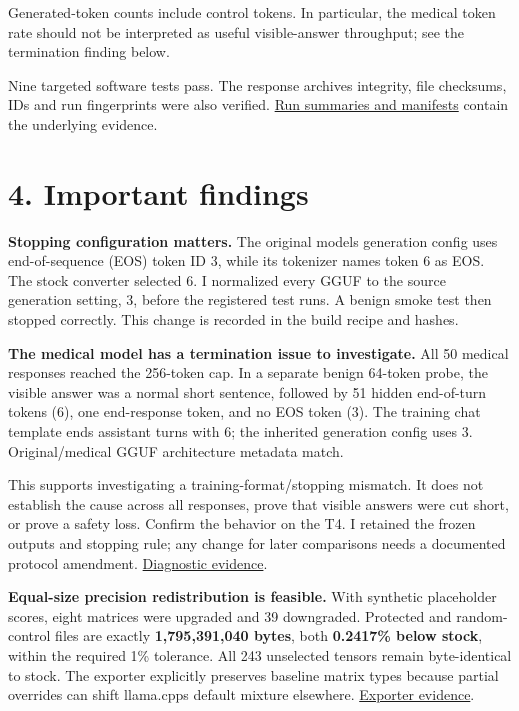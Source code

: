 \documentclass[11pt,a4paper]{article}
\begin{document}
Generated-token counts include control tokens. In particular, the
medical token rate should not be interpreted as useful visible-answer
throughput; see the termination finding below.

Nine targeted software tests pass. The response
archive\textquotesingle s integrity, file checksums, IDs and run
fingerprints were also verified.
\href{https://github.com/SushovitNanda/Lexsi_Hackathon/tree/manishshaw/results/mac/}{Run
summaries and manifests} contain the underlying evidence.

\section{4. Important findings}\label{important-findings}

\textbf{Stopping configuration matters.} The original
model\textquotesingle s generation config uses end-of-sequence (EOS)
token ID 3, while its tokenizer names token 6 as EOS. The stock
converter selected 6. I normalized every GGUF to the source generation
setting, 3, before the registered test runs. A benign smoke test then
stopped correctly. This change is recorded in the build recipe and
hashes.

\textbf{The medical model has a termination issue to investigate.} All
50 medical responses reached the 256-token cap. In a separate benign
64-token probe, the visible answer was a normal short sentence, followed
by 51 hidden end-of-turn tokens (6), one end-response token, and no EOS
token (3). The training chat template ends assistant turns with 6; the
inherited generation config uses 3. Original/medical GGUF architecture
metadata match.

This supports investigating a training-format/stopping mismatch. It does
not establish the cause across all responses, prove that visible answers
were cut short, or prove a safety loss. Confirm the behavior on the T4.
I retained the frozen outputs and stopping rule; any change for later
comparisons needs a documented protocol amendment.
\href{https://github.com/SushovitNanda/Lexsi_Hackathon/blob/manishshaw/results/mac/medical_termination_diagnostic.json}{Diagnostic
evidence}.

\textbf{Equal-size precision redistribution is feasible.} With synthetic
placeholder scores, eight matrices were upgraded and 39 downgraded.
Protected and random-control files are exactly \textbf{1,795,391,040
bytes}, both \textbf{0.2417\% below stock}, within the required 1\%
tolerance. All 243 unselected tensors remain byte-identical to stock.
The exporter explicitly preserves baseline matrix types because partial
overrides can shift llama.cpp\textquotesingle s default mixture
elsewhere.
\href{https://github.com/SushovitNanda/Lexsi_Hackathon/blob/manishshaw/results/mac/placeholder_protection_report.json}{Exporter
evidence}.
\end{document}

